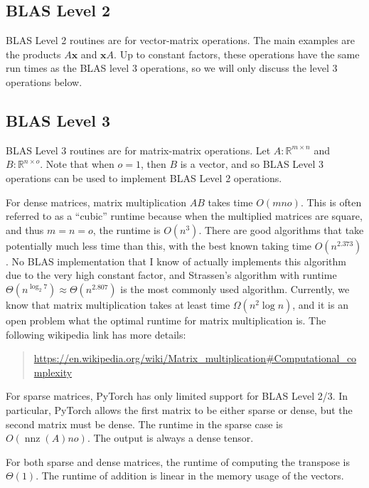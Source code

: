 \documentclass[10pt]{article}
\theoremstyle{definition}
\newcommand{\R}{\mathbb R}
\DeclareMathOperator{\nnz}{nnz}
\newcommand{\x}{\mathbf x}
\begin{document}
\subsection{BLAS Level 2}

BLAS Level 2 routines are for vector-matrix operations.
The main examples are the products $A\x$ and $\x A$.
Up to constant factors, these operations have the same run times as the BLAS level 3 operations, so we will only discuss the level 3 operations below.

\subsection{BLAS Level 3}

BLAS Level 3 routines are for matrix-matrix operations.
Let $A : \R^{m\times n}$ and $B : \R^{n \times o}$.
Note that when $o=1$, then $B$ is a vector, and so BLAS Level 3 operations can be used to implement BLAS Level 2 operations.

For dense matrices, matrix multiplication $AB$ takes time $O(mno)$.
This is often referred to as a ``cubic'' runtime because when the multiplied matrices are square,
and thus $m=n=o$,
the runtime is $O(n^3)$.
There are good algorithms that take potentially much less time than this,
with the best known taking time $O(n^{2.373})$.
No BLAS implementation that I know of actually implements this algorithm due to the very high constant factor,
and Strassen's algorithm with runtime $\Theta(n^{\log_2 7})\approx\Theta(n^{2.807})$ is the most commonly used algorithm.
Currently, we know that matrix multiplication takes at least time $\Omega(n^2\log n)$,
and it is an open problem what the optimal runtime for matrix multiplication is.
The following wikipedia link has more details:
\begin{quote}
\url{https://en.wikipedia.org/wiki/Matrix_multiplication#Computational_complexity}
\end{quote}

For sparse matrices, PyTorch has only limited support for BLAS Level 2/3.
In particular, PyTorch allows the first matrix to be either sparse or dense,
but the second matrix must be dense.
The runtime in the sparse case is $O(\nnz(A)no)$.
The output is always a dense tensor.

For both sparse and dense matrices,
the runtime of computing the transpose is $\Theta(1)$.
The runtime of addition is linear in the memory usage of the vectors.
\end{document}
